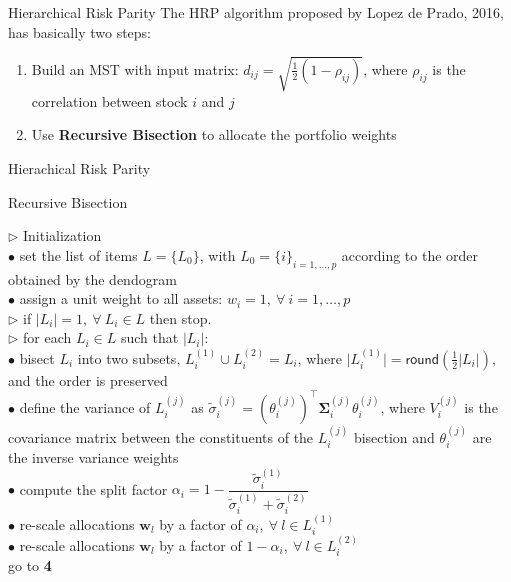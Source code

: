 \documentclass[aspectratio=169]{beamer}
\begin{document}
\begin{frame}{Hierarchical Risk Parity}
  \vspace{.5cm}
  The HRP algorithm proposed by Lopez de Prado, 2016, has basically two steps:
  \begin{enumerate}
  \pause
    \item Build an MST with input matrix: $d_{ij} = \sqrt{\frac{1}{2}(1 - \rho_{ij})}$, where $\rho_{ij}$ is the correlation between stock $i$ and $j$
  \pause
    \item Use \textbf{Recursive Bisection} to allocate the portfolio weights
  \end{enumerate}
\end{frame}
\begin{frame}{Hierachical Risk Parity}
  \vspace{.5cm}
  \begin{algorithm}[H]
    \scriptsize
  \caption{Recursive Bisection}
    \SetAlgoLined
    $\triangleright$ Initialization \\
    \hspace{.5cm} $\bullet$ set the list of items $L = \{L_{0}\}$, with $L_{0} = \{i\}_{i=1, \dots, p}$ according to the order obtained by the dendogram\\
    \hspace{.5cm} $\bullet$ assign a unit weight to all assets: $w_i = 1, ~\forall~ i = 1, \dots, p$\\
    $\triangleright$ if $\vert L_i \vert = 1,~\forall ~L_i \in L$ then stop.\\
    $\triangleright$ for each $L_i \in L$ such that $\vert L_i\vert$:\\
    \hspace{.5cm} $\bullet$ bisect $L_i$ into two subsets, $L_i^{(1)} \cup L_i^{(2)} = L_i$, where $\vert L_i^{(1)}\vert = \mathsf{round}(\frac{1}{2}\vert L_i\vert)$, and the order is preserved \\
    \hspace{.5cm} $\bullet$ define the variance of $L_{i}^{(j)}$ as $\tilde{\sigma}_{i}^{(j)} = (\theta^{(j)}_{i})^\top \boldsymbol\Sigma^{(j)}_{i} \theta^{(j)}_{i}$,
    where $V^{(j)}_{i}$ is the covariance matrix between the constituents of the $L^{(j)}_{i}$ bisection and $\theta^{(j)}_{i}$ are the inverse variance weights\\
    \hspace{.5cm} $\bullet$ compute the split factor $\alpha_i = 1 - \dfrac{\tilde{\sigma}_{i}^{(1)}}{\tilde{\sigma}_{i}^{(1)} + \tilde{\sigma}_{i}^{(2)}}$\\
    \hspace{.5cm} $\bullet$ re-scale allocations $\bm{w}_{l}$ by a factor of $\alpha_i, ~\forall~ l \in L^{(1)}_i$\\
    \hspace{.5cm} $\bullet$ re-scale allocations $\bm{w}_{l}$ by a factor of $1 - \alpha_i, ~\forall~ l \in L^{(2)}_i$\\
    go to \textbf{4}
  \end{algorithm}
\end{frame}
\end{document}
